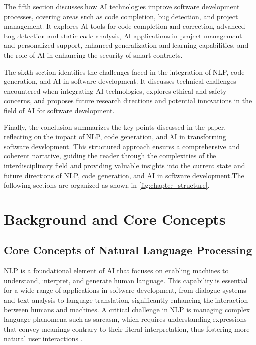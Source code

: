 The fifth section discusses how AI technologies improve software development processes, covering areas such as code completion, bug detection, and project management. It explores AI tools for code completion and correction, advanced bug detection and static code analysis, AI applications in project management and personalized support, enhanced generalization and learning capabilities, and the role of AI in enhancing the security of smart contracts.



The sixth section identifies the challenges faced in the integration of NLP, code generation, and AI in software development. It discusses technical challenges encountered when integrating AI technologies, explores ethical and safety concerns, and proposes future research directions and potential innovations in the field of AI for software development.



Finally, the conclusion summarizes the key points discussed in the paper, reflecting on the impact of NLP, code generation, and AI in transforming software development. This structured approach ensures a comprehensive and coherent narrative, guiding the reader through the complexities of the interdisciplinary field and providing valuable insights into the current state and future directions of NLP, code generation, and AI in software development.The following sections are organized as shown in \autoref{fig:chapter_structure}.







\section{Background and Core Concepts} \label{sec:Background and Core Concepts}



\subsection{Core Concepts of Natural Language Processing} \label{subsec:Core Concepts of NLP}

NLP is a foundational element of AI that focuses on enabling machines to understand, interpret, and generate human language. This capability is essential for a wide range of applications in software development, from dialogue systems and text analysis to language translation, significantly enhancing the interaction between humans and machines. A critical challenge in NLP is managing complex language phenomena such as sarcasm, which requires understanding expressions that convey meanings contrary to their literal interpretation, thus fostering more natural user interactions \cite{nimase2024morecontextshelpsarcasm}.



